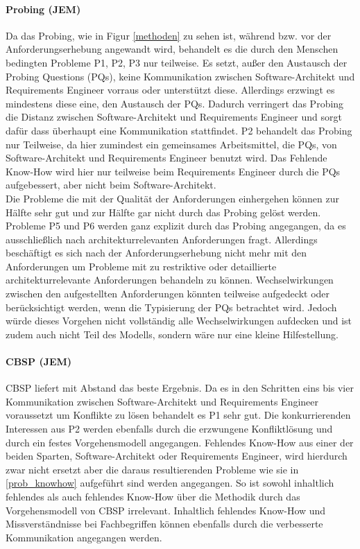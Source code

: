 \paragraph{Probing (JEM)}
Da das Probing, wie in Figur \ref{methoden} zu sehen ist, w\"ahrend bzw. vor der Anforderungserhebung angewandt wird, behandelt es die durch den Menschen bedingten Probleme P1, P2, P3 nur teilweise. Es setzt, au\ss{}er den Austausch der Probing Questions (PQs), keine Kommunikation zwischen Software-Architekt und Requirements Engineer vorraus oder unterst\"utzt diese. Allerdings erzwingt es mindestens diese eine, den Austausch der PQs. Dadurch verringert das Probing die Distanz zwischen Software-Architekt und Requirements Engineer und  sorgt daf\"ur dass \"uberhaupt eine Kommunikation stattfindet. P2 behandelt das Probing nur Teilweise, da hier zumindest ein gemeinsames Arbeitsmittel, die PQs, von Software-Architekt und Requirements Engineer benutzt wird. Das Fehlende Know-How wird hier nur teilweise beim Requirements Engineer durch die PQs aufgebessert, aber nicht beim Software-Architekt. \\

Die Probleme die mit der Qualit\"at der Anforderungen einhergehen k\"onnen zur H\"alfte sehr gut und zur H\"alfte gar nicht durch das Probing gel\"ost werden. Probleme P5 und P6 werden ganz explizit durch das Probing angegangen, da es ausschlie\ss{}lich nach architekturrelevanten Anforderungen fragt. Allerdings besch\"aftigt es sich nach der Anforderungserhebung nicht mehr mit den Anforderungen um Probleme mit zu restriktive oder detaillierte architekturrelevante Anforderungen behandeln zu k\"onnen. Wechselwirkungen zwischen den aufgestellten Anforderungen k\"onnten teilweise aufgedeckt oder ber\"ucksichtigt werden, wenn die Typisierung der PQs betrachtet wird. Jedoch w\"urde dieses Vorgehen nicht vollst\"andig alle Wechselwirkungen aufdecken und ist zudem auch nicht Teil des Modells, sondern w\"are nur eine kleine Hilfestellung. \\

\paragraph{CBSP (JEM)}
CBSP liefert mit Abstand das beste Ergebnis. Da es in den Schritten eins bis vier Kommunikation zwischen Software-Architekt und Requirements Engineer voraussetzt um Konflikte zu l\"osen behandelt es P1 sehr gut. Die konkurrierenden Interessen aus P2 werden ebenfalls durch die erzwungene Konfliktl\"osung und durch ein festes Vorgehensmodell angegangen. Fehlendes Know-How aus einer der beiden Sparten, Software-Architekt oder Requirements Engineer, wird hierdurch zwar nicht ersetzt aber die daraus resultierenden Probleme wie sie in \ref{prob_knowhow} aufgef\"uhrt sind werden angegangen. So ist sowohl inhaltlich fehlendes als auch fehlendes Know-How \"uber die Methodik durch das Vorgehensmodell von CBSP irrelevant. Inhaltlich fehlendes Know-How und Missverst\"andnisse bei Fachbegriffen k\"onnen ebenfalls durch die verbesserte Kommunikation angegangen werden. \\

